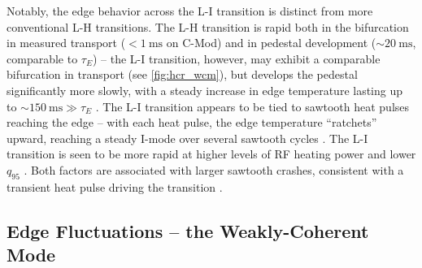 Notably, the edge behavior across the L-I transition is distinct from more conventional L-H transitions.  The L-H transition is rapid both in the bifurcation in measured transport ($< \SI{1}{\milli\second}$ on C-Mod) and in pedestal development ($\sim \SI{20}{\milli\second}$, comparable to $\tau_E$) -- the L-I transition, however, may exhibit a comparable bifurcation in transport (see \cref{fig:hcr_wcm}), but develops the pedestal significantly more slowly, with a steady increase in edge temperature lasting up to $\sim \SI{150}{\milli\second} \gg \tau_E$ \cite{McDermott2009,Whyte2010}.  The L-I transition appears to be tied to sawtooth heat pulses reaching the edge -- with each heat pulse, the edge temperature ``ratchets'' upward, reaching a steady I-mode over several sawtooth cycles \cite{Hubbard2011,Hubbard2012}.  The L-I transition is seen to be more rapid at higher levels of RF heating power and lower $q_{95}$ \cite{Whyte2010}.  Both factors are associated with larger sawtooth crashes, consistent with a transient heat pulse driving the transition \cite{Hubbard2012}.

\subsection{Edge Fluctuations -- the Weakly-Coherent Mode}\label{subsec:hcr_imode_wcm}

\begin{figure}
 \pushtooutside
\end{figure}

